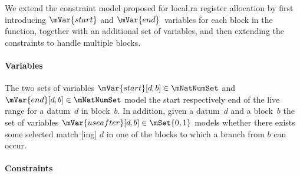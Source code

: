 We extend the \gls{constraint model} proposed for \gls{local.ra} \gls{register
  allocation} by first introducing $\mVar{start}$ and
$\mVar{end}$~\glspl{variable} for each \gls{block} in the \gls{function},
together with an additional set of \glspl{variable}, and then extending the
\glspl{constraint} to handle multiple \glspl{block}.


\paragraph{Variables}

The two sets of \glspl{variable} \mbox{$\mVar{start}[d \hspace{-.8pt}, b] \in
  \mNatNumSet$} and \mbox{$\mVar{end}[d \hspace{-.8pt}, b] \in \mNatNumSet$}
model the start respectively end of the \gls{live range} for a \gls{datum}~$d$
in \gls{block}~$b$\hspace{-.8pt}.
%
In addition, given a \gls{datum}~$d$ and a \gls{block}~$b$ the set of
\glspl{variable} \mbox{$\mVar{useafter}[d \hspace{-.8pt}, b] \in \mSet{0, 1}$}
models whether there exists some selected \gls{match} [ing] $d$
in one of the \glspl{block} to which a branch from $b$ can occur.


\paragraph{Constraints}

